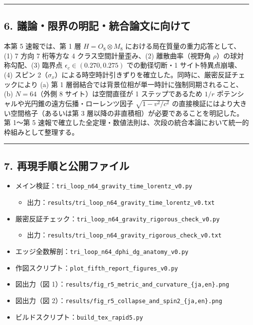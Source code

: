 \documentclass[
  a4paper,
]{ltjsarticle}
\providecommand{\tightlist}{%
  \setlength{\itemsep}{0pt}\setlength{\parskip}{0pt}}
\begin{document}
\begin{center}\rule{0.5\linewidth}{0.5pt}\end{center}

\subsection{6.
議論・限界の明記・統合論文に向けて}\label{ux8b70ux8ad6ux9650ux754cux306eux660eux8a18ux7d71ux5408ux8ad6ux6587ux306bux5411ux3051ux3066}

本第 5 速報では、第 1 層 \(H = O_8 \otimes M_8\)
における局在質量の重力応答として、(1) 7 方向 7 桁等方な 4
クラス空間計量歪み、(2) 離散曲率（視野角 \(\rho\)）の球対称勾配、(3)
臨界点 \(\epsilon_c \in (0.270, 0.275)\) での動径切断・1
サイト特異点崩壊、(4) スピン
2（\(\sigma_x\)）による時空時計引きずりを確立した。同時に、厳密反証チェックにより
(a) 第 1 層弱結合では背景位相が単一時計に強制同期されること、(b)
\(N = 64\)（外側 8 サイト）は空間直径が 1 ステップであるため \(1/r\)
ポテンシャルや光円錐の遠方伝播・ローレンツ因子 \(\sqrt{1 - v^2/c^2}\)
の直接検証にはより大きい空間格子（あるいは第 3
層以降の非直積相）が必要であることを明記した。第 1〜第 5
速報で確立した全定理・数値法則は、次段の統合本論において統一的枠組みとして整理する。

\begin{center}\rule{0.5\linewidth}{0.5pt}\end{center}

\subsection{7.
再現手順と公開ファイル}\label{ux518dux73feux624bux9806ux3068ux516cux958bux30d5ux30a1ux30a4ux30eb}

\begin{itemize}
\tightlist
\item
  メイン検証：\texttt{tri\_loop\_n64\_gravity\_time\_lorentz\_v0.py}

  \begin{itemize}
  \tightlist
  \item
    出力：\texttt{results/tri\_loop\_n64\_gravity\_time\_lorentz\_v0.txt}
  \end{itemize}
\item
  厳密反証チェック：\texttt{tri\_loop\_n64\_gravity\_rigorous\_check\_v0.py}

  \begin{itemize}
  \tightlist
  \item
    出力：\texttt{results/tri\_loop\_n64\_gravity\_rigorous\_check\_v0.txt}
  \end{itemize}
\item
  エッジ全数解剖：\texttt{tri\_loop\_n64\_dphi\_dg\_anatomy\_v0.py}
\item
  作図スクリプト：\texttt{plot\_fifth\_report\_figures\_v0.py}
\item
  図出力（図
  1）：\texttt{results/fig\_r5\_metric\_and\_curvature\_\{ja,en\}.png}
\item
  図出力（図
  2）：\texttt{results/fig\_r5\_collapse\_and\_spin2\_\{ja,en\}.png}
\item
  ビルドスクリプト：\texttt{build\_tex\_rapid5.py}
\end{itemize}
\end{document}
